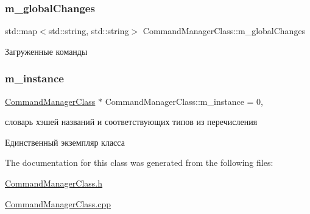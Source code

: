 \mbox{\label{class_command_manager_class_a88550817c9f5132113829ee39c04fc71}} 
\subsubsection{\texorpdfstring{m\+\_\+global\+Changes}{m\_globalChanges}}
{\footnotesize\ttfamily std\+::map$<$std\+::string, std\+::string$>$ Command\+Manager\+Class\+::m\+\_\+global\+Changes\hspace{0.3cm}{\ttfamily [private]}}



Загруженные команды 

\mbox{\label{class_command_manager_class_af5d0d5228f22a70bdef9ba0ebb8d20a1}} 
\subsubsection{\texorpdfstring{m\+\_\+instance}{m\_instance}}
{\footnotesize\ttfamily \hyperlink{class_command_manager_class}{Command\+Manager\+Class} $\ast$ Command\+Manager\+Class\+::m\+\_\+instance = 0\hspace{0.3cm}{\ttfamily [static]}, {\ttfamily [private]}}



словарь хэшей названий и соответствующих типов из перечисления 

Единственный экземпляр класса 

The documentation for this class was generated from the following files\+:\begin{DoxyCompactItemize}
\item 
\hyperlink{_command_manager_class_8h}{Command\+Manager\+Class.\+h}\item 
\hyperlink{_command_manager_class_8cpp}{Command\+Manager\+Class.\+cpp}\end{DoxyCompactItemize}

